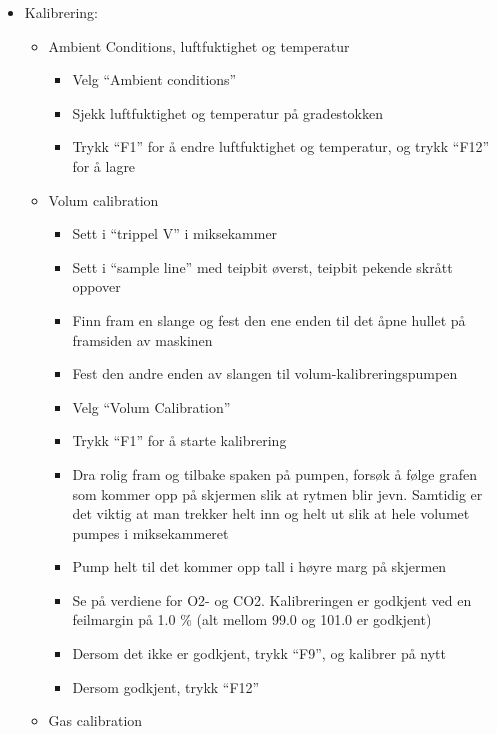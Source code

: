 \documentclass[
  letterpaper,
  DIV=11,
  numbers=noendperiod]{scrartcl}
\providecommand{\tightlist}{%
  \setlength{\itemsep}{0pt}\setlength{\parskip}{0pt}}\usepackage{longtable,booktabs,array}
\begin{document}
\begin{itemize}
\tightlist
\item
  Kalibrering:

  \begin{itemize}
  \tightlist
  \item
    Ambient Conditions, luftfuktighet og temperatur

    \begin{itemize}
    \tightlist
    \item
      Velg ``Ambient conditions''
    \item
      Sjekk luftfuktighet og temperatur på gradestokken
    \item
      Trykk ``F1'' for å endre luftfuktighet og temperatur, og trykk
      ``F12'' for å lagre
    \end{itemize}
  \item
    Volum calibration

    \begin{itemize}
    \tightlist
    \item
      Sett i ``trippel V'' i miksekammer
    \item
      Sett i ``sample line'' med teipbit øverst, teipbit pekende skrått
      oppover
    \item
      Finn fram en slange og fest den ene enden til det åpne hullet på
      framsiden av maskinen
    \item
      Fest den andre enden av slangen til volum-kalibreringspumpen
    \item
      Velg ``Volum Calibration''
    \item
      Trykk ``F1'' for å starte kalibrering
    \item
      Dra rolig fram og tilbake spaken på pumpen, forsøk å følge grafen
      som kommer opp på skjermen slik at rytmen blir jevn. Samtidig er
      det viktig at man trekker helt inn og helt ut slik at hele volumet
      pumpes i miksekammeret
    \item
      Pump helt til det kommer opp tall i høyre marg på skjermen
    \item
      Se på verdiene for O2- og CO2. Kalibreringen er godkjent ved en
      feilmargin på 1.0 \% (alt mellom 99.0 og 101.0 er godkjent)
    \item
      Dersom det ikke er godkjent, trykk ``F9'', og kalibrer på nytt
    \item
      Dersom godkjent, trykk ``F12''
    \end{itemize}
  \item
    Gas calibration


\end{itemize}
\end{itemize}
\end{document}
